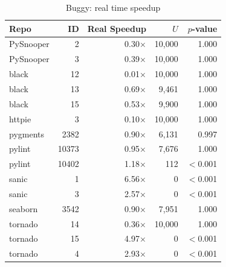 \begin{table}[htbp]
    \centering
    \caption{Buggy: real time speedup}
    \label{tab:buggy_real}
    \small
    \renewcommand{\arraystretch}{1.2}
    \begin{tabularx}{\linewidth}{@{} >{\raggedright\arraybackslash}X r r r r @{}}
        \toprule
        \textbf{Repo} & \textbf{ID} & \textbf{Real Speedup} & \textbf{$U$} & \textbf{$p$-value} \\
        \midrule
        PySnooper     & 2           & 0.30$\times$          & 10,000       & 1.000              \\
        PySnooper     & 3           & 0.39$\times$          & 10,000       & 1.000              \\
        black         & 12          & 0.01$\times$          & 10,000       & 1.000              \\
        black         & 13          & 0.69$\times$          & 9,461        & 1.000              \\
        black         & 15          & 0.53$\times$          & 9,900        & 1.000              \\
        httpie        & 3           & 0.10$\times$          & 10,000       & 1.000              \\
        pygments      & 2382        & 0.90$\times$          & 6,131        & 0.997              \\
        pylint        & 10373       & 0.95$\times$          & 7,676        & 1.000              \\
        pylint        & 10402       & 1.18$\times$          & 112          & $<$0.001           \\
        sanic         & 1           & 6.56$\times$          & 0            & $<$0.001           \\
        sanic         & 3           & 2.57$\times$          & 0            & $<$0.001           \\
        seaborn       & 3542        & 0.90$\times$          & 7,951        & 1.000              \\
        tornado       & 14          & 0.36$\times$          & 10,000       & 1.000              \\
        tornado       & 15          & 4.97$\times$          & 0            & $<$0.001           \\
        tornado       & 4           & 2.93$\times$          & 0            & $<$0.001           \\
        \bottomrule
    \end{tabularx}
\end{table}

